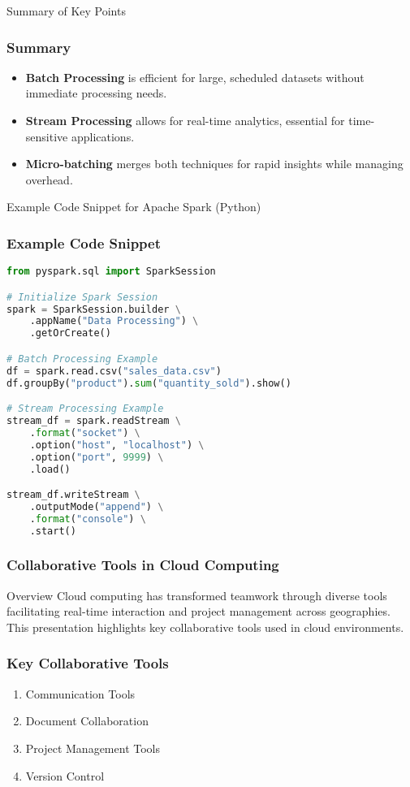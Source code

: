 \documentclass[aspectratio=169]{beamer}
\begin{document}
\begin{frame}{Summary of Key Points}
    \frametitle{Summary}
    \begin{itemize}
        \item \textbf{Batch Processing} is efficient for large, scheduled datasets without immediate processing needs.
        \item \textbf{Stream Processing} allows for real-time analytics, essential for time-sensitive applications.
        \item \textbf{Micro-batching} merges both techniques for rapid insights while managing overhead.
    \end{itemize}
\end{frame}

\begin{frame}[fragile]{Example Code Snippet for Apache Spark (Python)}
    \frametitle{Example Code Snippet}
    \begin{lstlisting}[language=Python]
from pyspark.sql import SparkSession

# Initialize Spark Session
spark = SparkSession.builder \
    .appName("Data Processing") \
    .getOrCreate()

# Batch Processing Example
df = spark.read.csv("sales_data.csv")
df.groupBy("product").sum("quantity_sold").show()

# Stream Processing Example
stream_df = spark.readStream \
    .format("socket") \
    .option("host", "localhost") \
    .option("port", 9999) \
    .load()

stream_df.writeStream \
    .outputMode("append") \
    .format("console") \
    .start()
    \end{lstlisting}
\end{frame}

\begin{frame}[fragile]
    \frametitle{Collaborative Tools in Cloud Computing}
    \begin{block}{Overview}
        Cloud computing has transformed teamwork through diverse tools facilitating real-time interaction and project management across geographies. This presentation highlights key collaborative tools used in cloud environments.
    \end{block}
\end{frame}

\begin{frame}[fragile]
    \frametitle{Key Collaborative Tools}
    \begin{enumerate}
        \item Communication Tools
        \item Document Collaboration
        \item Project Management Tools
        \item Version Control
    \end{enumerate}
\end{frame}
\end{document}
